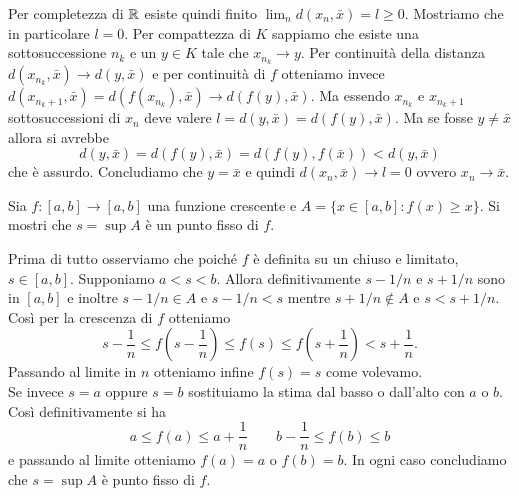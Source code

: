 Per completezza di $ \mathbb{R} $ esiste quindi finito $ \lim_n d(x_n, \bar{x}) = l \geq 0 $. Mostriamo che in particolare $ l = 0 $. Per compattezza di $ K $ sappiamo che esiste una sottosuccessione $ n_k $ e un $ y \in K $ tale che $ x_{n_k} \to y $. Per continuità della distanza $ d(x_{n_k}, \bar{x}) \to d(y, \bar{x}) $ e per continuità di $ f $ otteniamo invece $ d(x_{n_k + 1}, \bar{x}) = d(f(x_{n_k}), \bar{x}) \to d(f(y), \bar{x}) $. Ma essendo $ x_{n_k} $ e $ x_{n_k + 1} $ sottosuccessioni di $ x_n $ deve valere $ l = d(y, \bar{x}) = d(f(y), \bar{x}) $. Ma se fosse $ y \neq \bar{x} $ allora si avrebbe
\begin{equation*}
  d(y, \bar{x}) = d(f(y), \bar{x}) = d(f(y), f(\bar{x})) < d(y, \bar{x})
\end{equation*}
che è assurdo. Concludiamo che $ y = \bar{x} $ e quindi $ d(x_n, \bar{x}) \to l = 0 $ ovvero $ x_n \to \bar{x} $.

\begin{es}
  Sia $ f \colon [a, b] \to [a, b] $ una funzione crescente e $ A = \{x \in [a, b] : f(x) \geq x\} $. Si mostri che $ s = \sup{A} $ è un punto fisso di $ f $.
\end{es}
%
Prima di tutto osserviamo che poiché $ f $ è definita su un chiuso e limitato, $ s \in [a, b] $. Supponiamo $ a < s < b $. Allora definitivamente $ s - 1/n $ e $ s + 1/n $ sono in $ [a, b] $ e inoltre $ s - 1/n \in A $ e $ s - 1/n < s $ mentre $ s + 1/n \notin A $ e $ s < s + 1/n $. Così per la crescenza di $ f $ otteniamo
\begin{equation*}
  s - \frac{1}{n} \leq f\left(s - \frac{1}{n}\right) \leq f(s) \leq f\left(s +\frac{1}{n}\right) < s + \frac{1}{n}.
\end{equation*}
Passando al limite in $ n $ otteniamo infine $ f(s) = s $ come volevamo. \\
Se invece $ s = a $ oppure $ s = b $ sostituiamo la stima dal basso o dall'alto con $ a $ o $ b $. Così definitivamente si ha
\begin{equation*}
  a \leq f(a) \leq a + \frac{1}{n} \qquad b - \frac{1}{n} \leq f(b) \leq b
\end{equation*}
e passando al limite otteniamo $ f(a) = a  $ o $ f(b) = b $. In ogni caso concludiamo che $ s = \sup{A} $ è punto fisso di $ f $.

